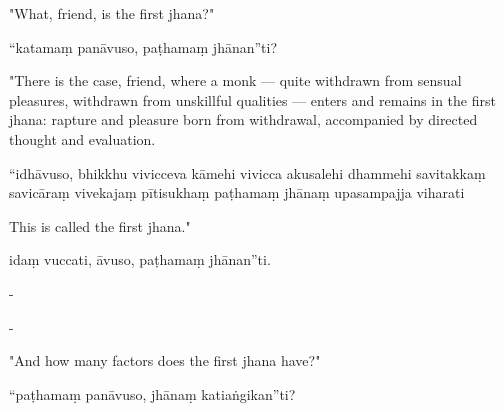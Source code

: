 \begin{samepage}
\begin{leftcolumn*}
"What, friend, is the first jhana?"
\end{leftcolumn*}

\begin{rightcolumn}
“katamaṃ panāvuso, paṭhamaṃ jhānan”ti?
\end{rightcolumn}
\end{samepage}

\begin{samepage}
\begin{leftcolumn*}
"There is the case, friend, where a monk — quite withdrawn from sensual pleasures, withdrawn from unskillful qualities — enters and remains in the first jhana: rapture and pleasure born from withdrawal, accompanied by directed thought and evaluation.
\end{leftcolumn*}

\begin{rightcolumn}
“idhāvuso, bhikkhu vivicceva kāmehi vivicca akusalehi dhammehi savitakkaṃ savicāraṃ vivekajaṃ pītisukhaṃ paṭhamaṃ jhānaṃ upasampajja viharati
\end{rightcolumn}
\end{samepage}

\begin{samepage}
\begin{leftcolumn*}
This is called the first jhana."
\end{leftcolumn*}

\begin{rightcolumn}
idaṃ vuccati, āvuso, paṭhamaṃ jhānan”ti.
\end{rightcolumn}
\end{samepage}

\begin{samepage}
\begin{leftcolumn*}
-
\end{leftcolumn*}

\begin{rightcolumn}
-
\end{rightcolumn}
\end{samepage}

\begin{samepage}
\begin{leftcolumn*}
"And how many factors does the first jhana have?"
\end{leftcolumn*}

\begin{rightcolumn}
“paṭhamaṃ panāvuso, jhānaṃ katiaṅgikan”ti?
\end{rightcolumn}
\end{samepage}

